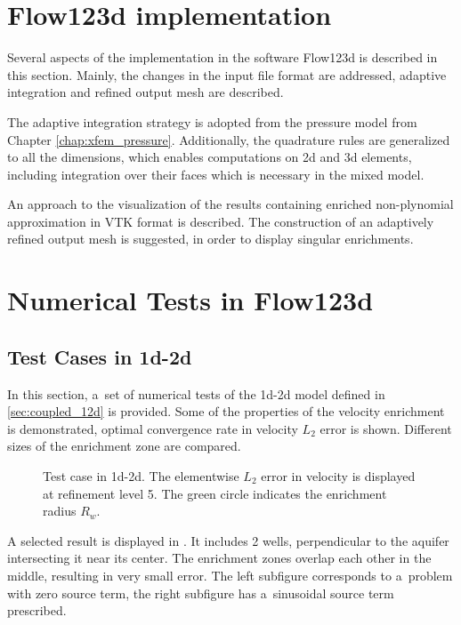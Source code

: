 
\section{Flow123d implementation}
Several aspects of the implementation in the software Flow123d is described in this section.
Mainly, the changes in the input file format are addressed,
adaptive integration and refined output mesh are described.

The adaptive integration strategy is adopted from the pressure model from Chapter \ref{chap:xfem_pressure}.
Additionally, the quadrature rules are generalized to all the dimensions, which enables
computations on 2d and 3d elements, including integration over their faces which is necessary in the mixed model.

An approach to the visualization of the results containing enriched non-plynomial approximation  in VTK format is described.
The construction of an adaptively refined output mesh is suggested, in order to display singular enrichments.


\section{Numerical Tests in Flow123d}
\subsection{Test Cases in 1d-2d} \label{sec:num_test_cases_1d2d}
In this section, a~set of numerical tests of the 1d-2d model defined in \ref{sec:coupled_12d} is provided.
Some of the properties of the velocity enrichment is demonstrated, optimal convergence rate in velocity $L_2$ error
is shown. Different sizes of the enrichment zone are compared.

\begin{figure}[!htb]
    \centering
    \caption[Error distribution in 1d-2d.]
    {Test case in 1d-2d. The elementwise $L_2$ error in velocity is displayed at refinement level 5.
    The green circle indicates the enrichment radius $R_w$. }
    \label{fig:mh_tc2_error}
\end{figure}
A selected result is displayed in .
It includes 2 wells, perpendicular to the aquifer intersecting it near its center.
The enrichment zones overlap each other in the middle, resulting in very small error.
The left subfigure corresponds to a~problem with zero source term, the right subfigure
has a~sinusoidal source term prescribed.

